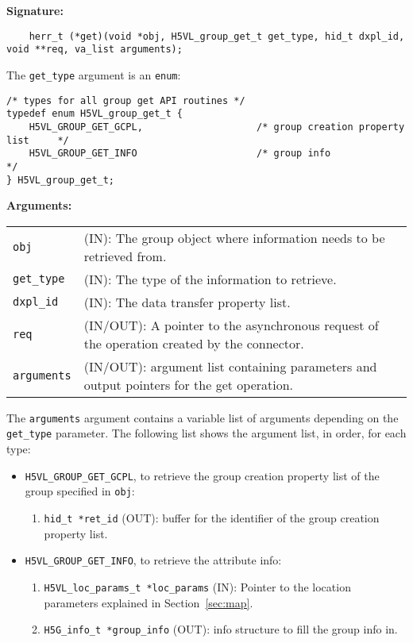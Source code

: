 \begin{mdframed}[style=bgbox]
\textbf{Signature:}
\begin{lstlisting}
    herr_t (*get)(void *obj, H5VL_group_get_t get_type, hid_t dxpl_id, void **req, va_list arguments);
\end{lstlisting}

The \texttt{get\_type} argument is an \texttt{enum}:
\begin{lstlisting}
/* types for all group get API routines */
typedef enum H5VL_group_get_t {                                                  
    H5VL_GROUP_GET_GCPL,                    /* group creation property list     */
    H5VL_GROUP_GET_INFO                     /* group info                       */
} H5VL_group_get_t; 
\end{lstlisting}

\textbf{Arguments:}\\
\begin{tabular}{l p{13.5cm}}
  \texttt{obj} & (IN): The group object where information needs to be
  retrieved from.\\
  \texttt{get\_type} & (IN): The type of the information to retrieve.\\
  \texttt{dxpl\_id} & (IN): The data transfer property list.\\
  \texttt{req} & (IN/OUT): A pointer to the asynchronous request of the
  operation created by the connector.\\
  \texttt{arguments} & (IN/OUT): argument list containing parameters and
  output pointers for the get operation. \\
\end{tabular}
\end{mdframed}

The \texttt{arguments} argument contains a variable list of arguments
depending on the \texttt{get\_type} parameter. The following list shows
the argument list, in order, for each type:

\begin{itemize}
\item \texttt{H5VL\_GROUP\_GET\_GCPL}, to retrieve the group creation
  property list of the group specified in \texttt{obj}:
  \begin{enumerate}
  \item \texttt{hid\_t *ret\_id} (OUT): buffer for the identifier of the
    group creation property list.
  \end{enumerate}

\item \texttt{H5VL\_GROUP\_GET\_INFO}, to retrieve the attribute info:
  \begin{enumerate}
  \item \texttt{H5VL\_loc\_params\_t *loc\_params} (IN): Pointer to the location
      parameters explained in Section~\ref{sec:map}. 
  \item \texttt{H5G\_info\_t *group\_info} (OUT): info structure to fill the
    group info in.
  \end{enumerate}
\end{itemize}

